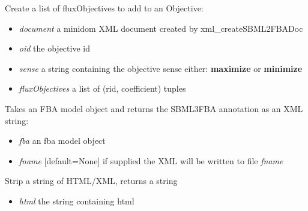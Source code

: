 \documentclass[a4paper,11pt,english]{sphinxmanual}
\begin{document}

\begin{fulllineitems}
\label{modules_doc:cbmpy.CBXML.xml_createSBML2FBAObjective}
Create a list of fluxObjectives to add to an Objective:
\begin{itemize}
\item {} 
\emph{document} a minidom XML document created by xml\_createSBML2FBADoc

\item {} 
\emph{oid} the objective id

\item {} 
\emph{sense} a string containing the objective sense either: \textbf{maximize} or \textbf{minimize}

\item {} 
\emph{fluxObjectives} a list of (rid, coefficient) tuples

\end{itemize}

\end{fulllineitems}


\begin{fulllineitems}
\label{modules_doc:cbmpy.CBXML.xml_getSBML2FBAannotation}
Takes an FBA model object and returns the SBML3FBA annotation as an XML string:
\begin{itemize}
\item {} 
\emph{fba} an fba model object

\item {} 
\emph{fname} {[}default=None{]} if supplied the XML will be written to file \emph{fname}

\end{itemize}

\end{fulllineitems}


\begin{fulllineitems}
\label{modules_doc:cbmpy.CBXML.xml_stripTags}
Strip a string of HTML/XML, returns a string
\begin{itemize}
\item {} 
\emph{html} the string containing html

\end{itemize}

\end{fulllineitems}
\end{document}
